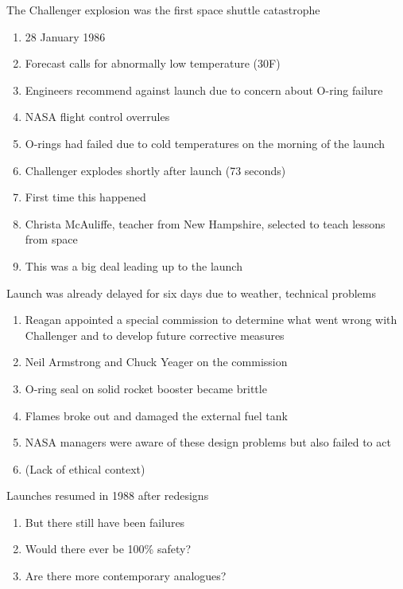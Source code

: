 \documentclass[aspectratio=1610,pdftex,dvipsnames,compress,xcolor={dvipsnames}]{beamer}
\begin{document}
\addtocounter{framenumber}{-1}
\begin{frame}{The Challenger explosion was the first space shuttle catastrophe}
    \begin{enumerate}[series=outerlist,topsep=0pt,itemsep=11pt,leftmargin=*,label=(\arabic*)]
        \item[]28 January 1986  
        \item[]Forecast calls for abnormally low temperature (30\degree F)   
        \item[]Engineers recommend against launch due to concern about O-ring failure
        \item[]NASA flight control overrules  
        \item[]O-rings had failed due to cold temperatures on the morning of the launch  
        \item[]Challenger explodes shortly after launch (73 seconds)  
        \item[]First time this happened  
        \item[]Christa McAuliffe, teacher from New Hampshire, selected to teach lessons from space
        \item[]This was a big deal leading up to the launch
    \end{enumerate}
\end{frame}


\begin{frame}{Launch was already delayed for six days due to weather, technical problems}
    \begin{enumerate}[series=outerlist,topsep=0pt,itemsep=21pt,leftmargin=*,label=(\arabic*)]
        \item[]Reagan appointed a special commission to determine what went wrong with Challenger and to develop future corrective measures  
        \item[]Neil Armstrong and Chuck Yeager on the commission
        \item[]O-ring seal on solid rocket booster became brittle  
        \item[]Flames broke out and damaged the external fuel tank  
        \item[]NASA managers were aware of these design problems but also failed to act  
        \item[](Lack of ethical context)
    \end{enumerate}
\end{frame}


\begin{frame}{Launches resumed in 1988 after redesigns}
    \begin{enumerate}[series=outerlist,topsep=0pt,itemsep=21pt,leftmargin=*,label=(\arabic*)]
        \item[]But there still have been failures  
        \item[]Would there ever be 100\% safety?
        \item[]Are there more contemporary analogues?
    \end{enumerate}
\end{frame}
\end{document}
